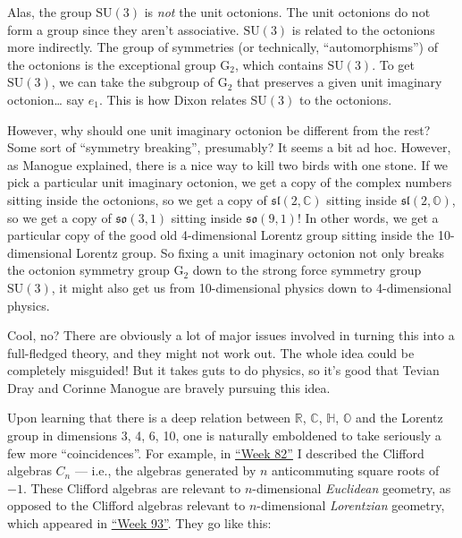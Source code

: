 \documentclass{article}
\begin{document}
Alas, the group \(\mathrm{SU}(3)\) is \emph{not} the unit octonions. The
unit octonions do not form a group since they aren't associative.
\(\mathrm{SU}(3)\) is related to the octonions more indirectly. The
group of symmetries (or technically, ``automorphisms'') of the octonions
is the exceptional group \(\mathrm{G}_2\), which contains
\(\mathrm{SU}(3)\). To get \(\mathrm{SU}(3)\), we can take the subgroup
of \(\mathrm{G}_2\) that preserves a given unit imaginary
octonion\ldots{} say \(e_1\). This is how Dixon relates
\(\mathrm{SU}(3)\) to the octonions.

However, why should one unit imaginary octonion be different from the
rest? Some sort of ``symmetry breaking'', presumably? It seems a bit ad
hoc. However, as Manogue explained, there is a nice way to kill two
birds with one stone. If we pick a particular unit imaginary octonion,
we get a copy of the complex numbers sitting inside the octonions, so we
get a copy of \(\mathfrak{sl}(2,\mathbb{C})\) sitting inside
\(\mathfrak{sl}(2,\mathbb{O})\), so we get a copy of
\(\mathfrak{so}(3,1)\) sitting inside \(\mathfrak{so}(9,1)\)! In other
words, we get a particular copy of the good old 4-dimensional Lorentz
group sitting inside the 10-dimensional Lorentz group. So fixing a unit
imaginary octonion not only breaks the octonion symmetry group
\(\mathrm{G}_2\) down to the strong force symmetry group
\(\mathrm{SU}(3)\), it might also get us from 10-dimensional physics
down to 4-dimensional physics.

Cool, no? There are obviously a lot of major issues involved in turning
this into a full-fledged theory, and they might not work out. The whole
idea could be completely misguided! But it takes guts to do physics, so
it's good that Tevian Dray and Corinne Manogue are bravely pursuing this
idea.

Upon learning that there is a deep relation between \(\mathbb{R}\),
\(\mathbb{C}\), \(\mathbb{H}\), \(\mathbb{O}\) and the Lorentz group in
dimensions 3, 4, 6, 10, one is naturally emboldened to take seriously a
few more ``coincidences''. For example, in
\protect\hyperlink{week82}{``Week 82''} I described the Clifford
algebras \(C_n\) --- i.e., the algebras generated by \(n\) anticommuting
square roots of \(-1\). These Clifford algebras are relevant to
\(n\)-dimensional \emph{Euclidean} geometry, as opposed to the Clifford
algebras relevant to \(n\)-dimensional \emph{Lorentzian} geometry, which
appeared in \protect\hyperlink{week93}{``Week 93''}. They go like this:
\end{document}
